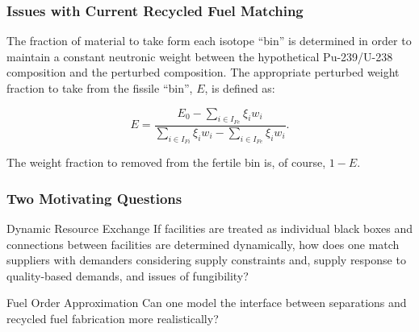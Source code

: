 \begin{frame}[ctb!]
  \frametitle{Issues with Current Recycled Fuel Matching} 
  
  The fraction of material to take form each isotope ``bin'' is determined in
  order to maintain a constant neutronic weight between the hypothetical
  Pu-239/U-238 composition and the perturbed composition. The appropriate
  perturbed weight fraction to take from the fissile ``bin'', $E$, is defined
  as:
  
  \begin{equation}
    E = \frac{E_0 - \sum_{i \in I_{Fe}} \xi_i w_i}
    {\sum_{i \in I_{Fi}} \xi_i w_i - \sum_{i \in I_{Fe}} \xi_i w_i}.
  \end{equation}

  The weight fraction to removed from the fertile bin is, of course, $1-E$.

\end{frame}
  
\begin{frame}[ctb!]
  \frametitle{Two Motivating Questions}

  \begin{block}{Dynamic Resource Exchange}
    If facilities are treated as individual black boxes and connections between
    facilities are determined dynamically, how does one match suppliers with
    demanders considering supply constraints and, supply response to
    quality-based demands, and issues of fungibility?
  \end{block}

  \pause

  \begin{block}{Fuel Order Approximation}
    Can one model the interface between separations and recycled fuel
    fabrication more realistically?
  \end{block}

\end{frame}
